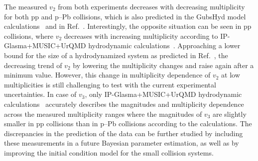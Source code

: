 The measured $v_{2}$ from both experiments decreases with decreasing multiplicity for both pp and p--Pb collisions, which is also predicted in the GubsHyd model calculations~\cite{Taghavi:2019mqz} and in Ref.~\cite{Weller:2017tsr}. Interestingly, the opposite situation can be seen in pp collisions, where $v_2$ decreases with increasing multiplicity according to IP-Glasma+MUSIC+UrQMD hydrodynamic calculations~\cite{Schenke:2020mbo}. 
Approaching a lower bound for the size of a hydrodynamized
system as predicted in Ref.~\cite{Taghavi:2019mqz}, 
the decreasing trend of $v_2$ by lowering the multiplicity changes and raise again after a minimum value. However, this change in multiplicity dependence of $v_2$ at low multiplicities is still challenging to test with the current experimental uncertainties. In case of $v_3$, only IP-Glasma+MUSIC+UrQMD hydrodynamic calculations~\cite{Schenke:2020mbo} accurately describes the magnitudes and multiplicity dependence across the measured multiplicity ranges where the magnitudes of $v_3$ are slightly smaller in pp collisions than in p--Pb collisions according to the calculations. The discrepancies in the prediction of the data can be further studied by including these measurements in a future Bayesian parameter estimation, as well as by improving the initial condition model for the small collision systems.

